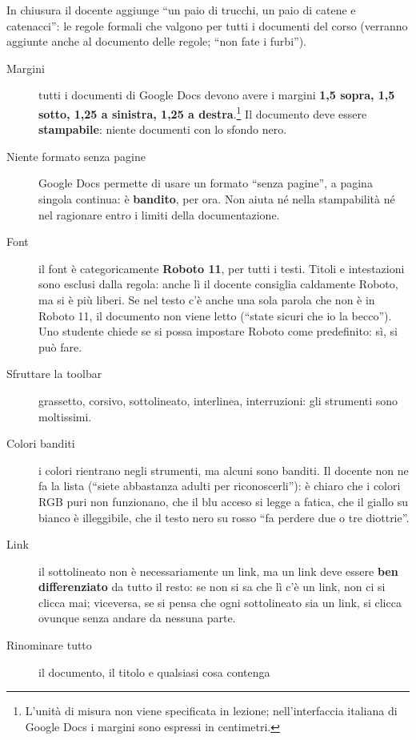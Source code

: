 In chiusura il docente aggiunge ``un paio di trucchi, un paio di catene e
catenacci'': le regole formali che valgono per tutti i documenti del corso
(verranno aggiunte anche al documento delle regole; ``non fate i furbi'').

\begin{description}
  \item[Margini] tutti i documenti di Google Docs devono avere i margini
        \textbf{1,5 sopra, 1,5 sotto, 1,25 a sinistra, 1,25 a
        destra}.\footnote{L'unità di misura non viene specificata in lezione;
        nell'interfaccia italiana di Google Docs i margini sono espressi in
        centimetri.} Il documento deve essere \textbf{stampabile}: niente
        documenti con lo sfondo nero.
  \item[Niente formato senza pagine] Google Docs permette di usare un formato
        ``senza pagine'', a pagina singola continua: è \textbf{bandito}, per
        ora. Non aiuta né nella stampabilità né nel ragionare entro i limiti
        della documentazione.
  \item[Font] il font è categoricamente \textbf{Roboto 11}, per tutti i testi.
        Titoli e intestazioni sono esclusi dalla regola: anche lì il docente
        consiglia caldamente Roboto, ma si è più liberi. Se nel testo c'è
        anche una sola parola che non è in Roboto 11, il documento non viene
        letto (``state sicuri che io la becco''). Uno studente chiede se si
        possa impostare Roboto come predefinito: sì, si può fare.
  \item[Sfruttare la toolbar] grassetto, corsivo, sottolineato, interlinea,
        interruzioni: gli strumenti sono moltissimi.
  \item[Colori banditi] i colori rientrano negli strumenti, ma alcuni sono
        banditi. Il docente non ne fa la lista (``siete abbastanza adulti per
        riconoscerli''): è chiaro che i colori RGB puri non funzionano, che il
        blu acceso si legge a fatica, che il giallo su bianco è illeggibile,
        che il testo nero su rosso ``fa perdere due o tre diottrie''.
  \item[Link] il sottolineato non è necessariamente un link, ma un link deve
        essere \textbf{ben differenziato} da tutto il resto: se non si sa che
        lì c'è un link, non ci si clicca mai; viceversa, se si pensa che ogni
        sottolineato sia un link, si clicca ovunque senza andare da nessuna
        parte.
  \item[Rinominare tutto] il documento, il titolo e qualsiasi cosa contenga

\end{description}
